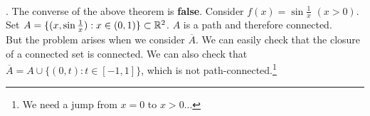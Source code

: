 \\
\rmk. The converse of the above theorem is \textbf{false}. Consider $f(x) = \sin \frac{1}{x}$ $(x>0)$. Set $A = \{(x, \sin\frac{1}{x}): x\in (0, 1) \}\subset \mathbb{R}^2$. $A$ is a path and therefore connected.\\
But the problem arises when we consider $\overline{A}$. We can easily check that the closure of a connected set is connected. We can also check that $\overline{A} = A \cup \{(0, t): t\in[-1, 1] \}$, which is not path-connected.\footnote{We need a jump from $x=0$ to $x>0$...}

\pagebreak